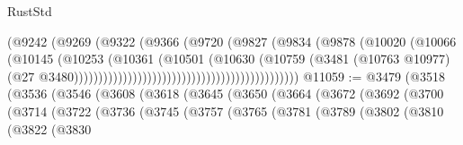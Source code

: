 \begin{lexlean}{RustStd}
\begin{coremodule}
                                                            (@9242
                                                              (@9269
                                                                (@9322
                                                                  (@9366
                                                                    (@9720
                                                                      (@9827
                                                                        (@9834
                                                                          (@9878
                                                                            (@10020
                                                                              (@10066
                                                                                (@10145
                                                                                  (@10253
                                                                                    (@10361
                                                                                      (@10501
                                                                                        (@10630
                                                                                          (@10759
                                                                                            (@3481
                                                                                              (@10763
                                                                                                @10977)
                                                                                              (@27
                                                                                                @3480))))))))))))))))))))))))))))))))))))))))))))))
@11059 := @3479
    (@3518
      (@3536
        (@3546
          (@3608
            (@3618
              (@3645
                (@3650
                  (@3664
                    (@3672
                      (@3692
                        (@3700
                          (@3714
                            (@3722
                              (@3736
                                (@3745
                                  (@3757
                                    (@3765
                                      (@3781
                                        (@3789
                                          (@3802
                                            (@3810
                                              (@3822
                                                (@3830

\end{coremodule}
\end{lexlean}
